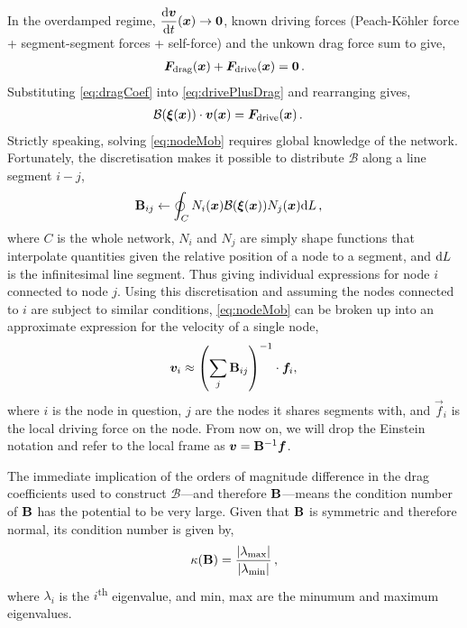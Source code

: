 In the overdamped regime, $\dfrac{\rvar{d}\vec{v}}{\rvar{d}t}(\vec{x}) \to \vec{0}$, known driving forces (Peach-K\"{o}hler force + segment-segment forces + self-force) and the unkown drag force sum to give,
\begin{align}\label{eq:drivePlusDrag}
    \vec{F}_\rvar{drag}(\vec{x}) + \vec{F}_\rvar{drive}(\vec{x}) = \vec{0}\,.
\end{align}
Substituting \cref{eq:dragCoef} into \cref{eq:drivePlusDrag} and rearranging gives,
\begin{align}\label{eq:nodeMob}
    \mathcal{B}(\vec{\xi}(\vec{x})) \cdot \vec{v}(\vec{x}) & = \vec{F}_\rvar{drive}(\vec{x})\,.
\end{align}
Strictly speaking, solving \cref{eq:nodeMob} requires global knowledge of the network. Fortunately, the discretisation makes it possible to distribute $\mathcal{B}$ along a line segment $i-j$,
\begin{align}\label{eq:dragMatrix}
    \mtx{B}_{ij} & \gets \oint_{C} N_i(\vec{x}) \mathcal{B}(\vec{\xi}(\vec{x})) N_j(\vec{x}) \rvar{d}L\,,
\end{align}
where $C$ is the whole network, $N_i$ and $N_j$ are simply shape functions that interpolate quantities given the relative position of a node to a segment, and $\textrm{d}L$ is the infinitesimal line segment. Thus giving individual expressions for node $i$ connected to node $j$. Using this discretisation and assuming the nodes connected to $i$ are subject to similar conditions, \cref{eq:nodeMob} can be broken up into an approximate expression for the velocity of a single node,
\begin{align}\label{eq:nodeVel}
    \vec{v}_i \approx \left(\sum\limits_j \mtx{B}_{ij}\right)^{-1} \cdot \vec{f}_i,\,
\end{align}
where $i$ is the node in question, $j$ are the nodes it shares segments with, and $\vec{f}_i$ is the local driving force on the node. From now on, we will drop the Einstein notation and refer to the local frame as $\vec{v} = \mtx{B}^{-1} \vec{f}$.

The immediate implication of the orders of magnitude difference in the drag coefficients used to construct $\mathcal{B}$---and therefore $\mathbf{B}$---means the condition number of $\mathbf{B}$ has the potential to be very large. Given that $\mathbf{B}$ is symmetric and therefore normal, its condition number is given by,
\begin{align}\label{eq:conditionNumb}
    \kappa(\mathbf{B}) = \dfrac{\lvert \lambda_{\textrm{max}} \rvert}{\lvert \lambda_{\textrm{min}} \rvert} \,,
\end{align}
where $\lambda_i$ is the $i$\textsuperscript{th} eigenvalue, and min, max are the minumum and maximum eigenvalues.

